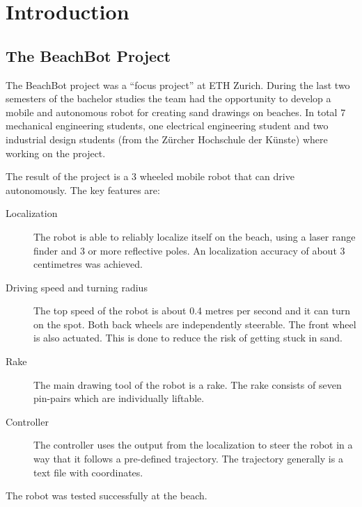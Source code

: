 \chapter{Introduction}
\section{The BeachBot Project}
The BeachBot project was a \enquote{focus project} at ETH Zurich. During the last two semesters of the bachelor studies the team had the opportunity to develop a mobile and autonomous robot for creating sand drawings on beaches. In total 7 mechanical engineering students, one electrical engineering student and two industrial design students (from the Zürcher Hochschule der Künste) where working on the project. 

The result of the project is a 3 wheeled mobile robot that can drive autonomously. The key features are:
\begin{description}
\item[Localization] The robot is able to reliably localize itself on the beach, using a laser range finder and 3 or more reflective poles. An localization accuracy of about 3 centimetres was achieved.
\item[Driving speed and turning radius] The top speed of the robot is about 0.4 metres per second and it can turn on the spot. Both back wheels are independently steerable. The front wheel is also actuated. This is done to reduce the risk of getting stuck in sand.
\item[Rake] The main drawing tool of the robot is a rake. The rake consists of seven pin-pairs which are individually liftable.
\item[Controller] The controller uses the output from the localization to steer the robot in a way that it follows a pre-defined trajectory. The trajectory generally is a text file with coordinates.
\end{description}

The robot was tested successfully at the beach.

